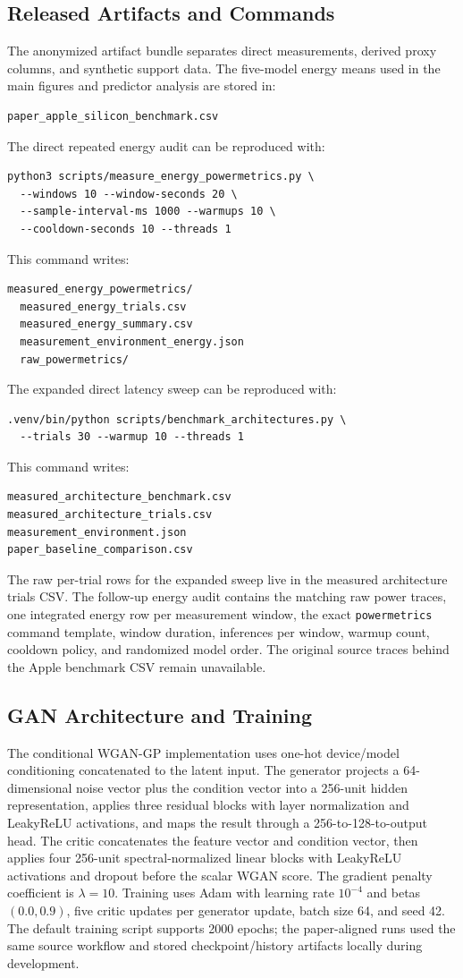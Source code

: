 \documentclass{svproc}
\begin{document}
\subsection{Released Artifacts and Commands}
The anonymized artifact bundle separates direct measurements, derived proxy columns,
and synthetic support data. The five-model energy means used in the main
figures and predictor analysis are stored in:
\begin{verbatim}
paper_apple_silicon_benchmark.csv
\end{verbatim}
The direct repeated energy audit can be reproduced with:
\begin{verbatim}
python3 scripts/measure_energy_powermetrics.py \
  --windows 10 --window-seconds 20 \
  --sample-interval-ms 1000 --warmups 10 \
  --cooldown-seconds 10 --threads 1
\end{verbatim}
This command writes:
\begin{verbatim}
measured_energy_powermetrics/
  measured_energy_trials.csv
  measured_energy_summary.csv
  measurement_environment_energy.json
  raw_powermetrics/
\end{verbatim}
The expanded direct latency sweep can be reproduced with:
\begin{verbatim}
.venv/bin/python scripts/benchmark_architectures.py \
  --trials 30 --warmup 10 --threads 1
\end{verbatim}
This command writes:
\begin{verbatim}
measured_architecture_benchmark.csv
measured_architecture_trials.csv
measurement_environment.json
paper_baseline_comparison.csv
\end{verbatim}
The raw per-trial rows for the expanded sweep live in the measured architecture
trials CSV. The follow-up energy audit
contains the matching raw power traces, one integrated energy row per
measurement window, the exact \texttt{powermetrics} command template, window
duration, inferences per window, warmup count, cooldown policy, and randomized
model order. The original source traces behind the Apple benchmark CSV remain
unavailable.

\subsection{GAN Architecture and Training}
The conditional WGAN-GP implementation uses one-hot device/model conditioning
concatenated to the latent input. The generator projects a 64-dimensional noise
vector plus the condition vector into a 256-unit hidden representation, applies
three residual blocks with layer normalization and LeakyReLU activations, and
maps the result through a 256-to-128-to-output head. The critic concatenates
the feature vector and condition vector, then applies four 256-unit
spectral-normalized linear blocks with LeakyReLU activations and dropout before
the scalar WGAN score. The gradient penalty coefficient is $\lambda = 10$.
Training uses Adam with learning rate $10^{-4}$ and betas $(0.0, 0.9)$, five
critic updates per generator update, batch size 64, and seed 42. The default
training script supports 2000 epochs; the paper-aligned runs used the same
source workflow and stored checkpoint/history artifacts locally during
development.
\end{document}
